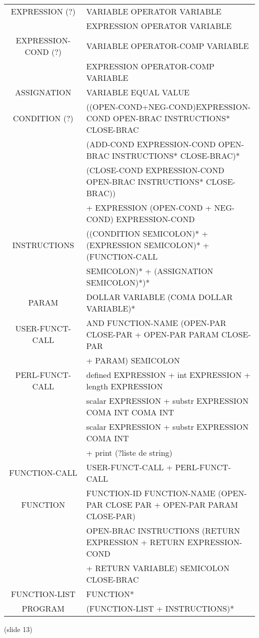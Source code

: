 \documentclass[a4paper,10pt]{article}
\begin{document}
~\\

\hspace{-4.5cm}\begin{tabular}{|c|l|}
\hline
EXPRESSION (?)		& VARIABLE OPERATOR VARIABLE   \\
					& EXPRESSION OPERATOR VARIABLE \\ \hline
EXPRESSION-COND (?)	& VARIABLE OPERATOR-COMP VARIABLE   \\
					& EXPRESSION OPERATOR-COMP VARIABLE \\ \hline
ASSIGNATION			& VARIABLE EQUAL VALUE \\ \hline
CONDITION (?)		& ((OPEN-COND+NEG-COND)EXPRESSION-COND OPEN-BRAC INSTRUCTIONS* CLOSE-BRAC\\
					& (ADD-COND EXPRESSION-COND OPEN-BRAC INSTRUCTIONS* CLOSE-BRAC)* \\
					& (CLOSE-COND EXPRESSION-COND OPEN-BRAC INSTRUCTIONS* CLOSE-BRAC))\\
					& + EXPRESSION (OPEN-COND + NEG-COND) EXPRESSION-COND \\ \hline
INSTRUCTIONS		& ((CONDITION SEMICOLON)* + (EXPRESSION SEMICOLON)* + (FUNCTION-CALL \\ 
					& SEMICOLON)* + (ASSIGNATION SEMICOLON)*)* \\ \hline
PARAM				& DOLLAR VARIABLE (COMA DOLLAR VARIABLE)* \\ \hline
USER-FUNCT-CALL		& AND FUNCTION-NAME (OPEN-PAR CLOSE-PAR + OPEN-PAR PARAM CLOSE-PAR  \\
					& + PARAM) SEMICOLON \\ \hline
PERL-FUNCT-CALL		& defined EXPRESSION + int EXPRESSION + length EXPRESSION \\ 
					& scalar EXPRESSION + substr EXPRESSION COMA INT COMA INT \\
					& scalar EXPRESSION + substr EXPRESSION COMA INT  \\
					& + print (?liste de string) \\ \hline
FUNCTION-CALL		& USER-FUNCT-CALL + PERL-FUNCT-CALL \\ \hline
FUNCTION			& FUNCTION-ID FUNCTION-NAME (OPEN-PAR CLOSE PAR + OPEN-PAR PARAM CLOSE-PAR) \\
					& OPEN-BRAC INSTRUCTIONS (RETURN EXPRESSION + RETURN EXPRESSION-COND \\
					& + RETURN VARIABLE) SEMICOLON CLOSE-BRAC \\ \hline
FUNCTION-LIST		& FUNCTION* \\ \hline
PROGRAM				& (FUNCTION-LIST + INSTRUCTIONS)*\\ \hline

					
					
\end{tabular}




(slide 13)
\end{document}
